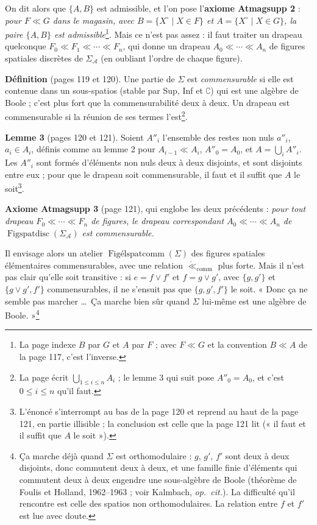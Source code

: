 \documentclass[11pt,a4paper]{article}
\begin{document}
On dit alors que $\{A, B\}$ est admissible, et l'on pose l'\textbf{axiome
Atmagsupp 2} : \emph{pour $F \ll G$ dans le magasin, avec $B = \{X^{\circ} \mid X
\in F\}$ et $A = \{X^{\circ} \mid X \in G\}$, la paire $\{A, B\}$ est
admissible}\footnote{La page indexe $B$ par $G$ et $A$ par $F$ ; avec $F \ll G$ et
la convention $B \ll A$ de la page 117, c'est l'inverse.}. Mais ce n'est pas
assez : il faut traiter un drapeau quelconque $F_{0} \ll F_{1} \ll \cdots \ll
F_{n}$, qui donne un drapeau $A_{0} \ll \cdots \ll A_{n}$ de figures spatiales
discrètes de $\Sigma_{\mathcal{A}}$ (en oubliant l'ordre de chaque figure).

\textbf{Définition} (pages 119 et 120). Une partie de $\Sigma$ est
\emph{commensurable} si elle est contenue dans un sous-spatios (stable par Sup,
Inf et $\complement$) qui est une algèbre de Boole ; c'est plus fort que la
commensurabilité deux à deux. Un drapeau est commensurable si la réunion de ses
termes l'est\footnote{La page écrit $\bigcup_{1 \leq i \leq n}A_{i}$ ; le lemme 3
qui suit pose $A''_{0} = A_{0}$, et c'est $0 \leq i \leq n$ qu'il faut.}.

\textbf{Lemme 3} (pages 120 et 121). Soient $A''_{i}$ l'ensemble des restes non
nuls $a''_{i}$, $a_{i} \in A_{i}$, définis comme au lemme 2 pour $A_{i-1} \ll
A_{i}$, $A''_{0} = A_{0}$, et $A = \bigcup_{i} A''_{i}$. Les $A''_{i}$ sont
formés d'éléments non nuls deux à deux disjoints, et sont disjoints entre eux ;
pour que le drapeau soit commensurable, il faut et il suffit que $A$ le
soit\footnote{L'énoncé s'interrompt au bas de la page 120 et reprend au haut de
la page 121, en partie illisible ; la conclusion est celle que la page 121 lit
(« il faut et il suffit que $A$ le soit »).}.

\textbf{Axiome Atmagsupp 3} (page 121), qui englobe les deux précédents :
\emph{pour tout drapeau $F_{0} \ll \cdots \ll F_{n}$ de figures, le drapeau
correspondant $A_{0} \ll \cdots \ll A_{n}$ de
$\operatorname{Figspatdisc}(\Sigma_{\mathcal{A}})$ est commensurable.}

Il envisage alors un atelier $\operatorname{\text{Figélspatcomm}}(\Sigma)$ des
figures spatiales élémentaires commensurables, avec une relation
$\mathrel{\mathring{\ll}}_{\mathrm{comm}}$ plus forte. Mais il n'est pas clair
qu'elle soit transitive : si $e = f \vee f'$ et $f = g \vee g'$, avec
$\{g, g'\}$ et $\{g \vee g', f'\}$ commensurables, il ne s'ensuit pas que $\{g,
g', f'\}$ le soit. « Donc ça ne semble pas marcher \ldots\ Ça marche bien sûr
quand $\Sigma$ lui-même est une algèbre de Boole. »\footnote{Ça marche déjà quand
$\Sigma$ est orthomodulaire : $g$, $g'$, $f'$ sont deux à deux disjoints, donc
commutent deux à deux, et une famille finie d'éléments qui commutent deux à deux
engendre une sous-algèbre de Boole (théorème de Foulis et Holland, 1962--1963 ;
voir Kalmbach, \emph{op.\ cit.}). La difficulté qu'il rencontre est celle des
spatios non orthomodulaires. La relation entre $f$ et $f'$ est lue avec doute.}
\end{document}
